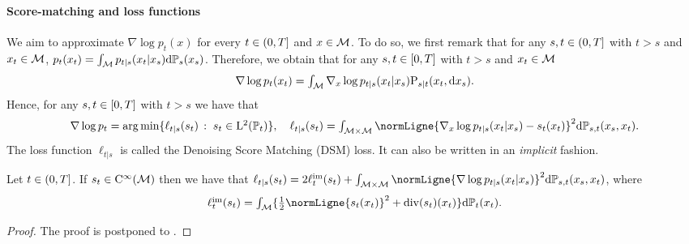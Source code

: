 \paragraph{Score-matching and loss functions}
We aim to approximate $\nabla \log p_t(x)$ for every $t \in \left(0,T\right]$ and
$x \in \mathcal M$. To do so, we first remark that for any $s,t \in \left(0,T\right]$ with $t > s$ and
$x_t \in \mathcal M$, $p_t(x_t) = \int_{\mathcal M} p_{t|s}(x_t|x_s) \mathrm{d} \mathbb{P}_s(x_s)$.  Therefore,
we obtain that for any $s, t \in \left[0,T\right]$ with $t > s$ and $x_t \in \mathcal M$
  \begin{equation}
  \textstyle{
    \nabla \log p_t(x_t) = \int_{\mathcal M} \nabla_x \log p_{t|s}(x_t|x_s) \mathrm{P}_{s|t}(x_t, \mathrm{d}x_s)  .
    }    
  \end{equation}
  Hence, for any $s, t \in \left[0,T\right]$ with $t > s$ we have that
  \begin{equation}
    \textstyle{
      \nabla \log p_t = \argmin \ensembleLigne{\ell_{t|s}(s_t)}{s_t \in \rmL^2(\Pbb_t)}  , \quad \ell_{t|s}(s_t) = \int_{\M \times \M} \normLigne{\nabla_x \log p_{t|s}(x_t|x_s) - s_t(x_t)}^2 \rmd \Pbb_{s,t}(x_s,x_t)   .
      }
    \end{equation}
    The loss function $\ell_{t|s}$ is called the Denoising Score Matching (DSM)
    loss. It can also be written in an \emph{implicit} fashion.
    \begin{proposition}
      \label{prop:implicit_der}
      Let $t \in \left(0,T\right]$. If $s_t \in \mathrm{C}^\infty(\mathcal M)$ then we have that  $\ell_{t|s}(s_t) = 2 \ellim_t(s_t) + \int_{\M \times \M} \normLigne{\nabla \log p_{t|s}(x_t|x_s)}^2 \rmd \Pbb_{s,t}(x_s,x_t)$, where
      \begin{equation}
        \textstyle{
          \ellim_t(s_t) = \int_\M \{ \tfrac{1}{2}\normLigne{s_t(x_t)}^2 + \dive(s_t)(x_t) \}  \rmd \Pbb_t(x_t)  . 
          }
      \end{equation}

    \end{proposition}

    \begin{proof}
      The proof is postponed to .
    \end{proof}

